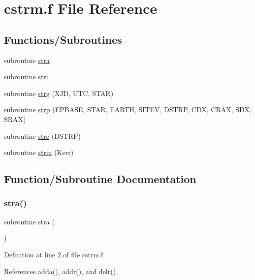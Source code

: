 \hypertarget{cstrm_8f}{}\section{cstrm.\+f File Reference}
\label{cstrm_8f}
\subsection*{Functions/\+Subroutines}
\begin{DoxyCompactItemize}
\item 
subroutine \hyperlink{cstrm_8f_aa1037acded2c0ef566a062bfc4609d4a}{stra}
\item 
subroutine \hyperlink{cstrm_8f_a6cebfa9d7b09bbf12e73113d94dae7ed}{stri}
\item 
subroutine \hyperlink{cstrm_8f_ac7544830764ddfede7a3de635483a4e5}{strg} (X\+JD, U\+TC, S\+T\+AR)
\item 
subroutine \hyperlink{cstrm_8f_abd2539dadf01efc58dae10cbed8b911e}{strp} (E\+P\+B\+A\+SE, S\+T\+AR, E\+A\+R\+TH, S\+I\+T\+EV, D\+S\+T\+RP, C\+DX, C\+R\+AX, S\+DX, S\+R\+AX)
\item 
subroutine \hyperlink{cstrm_8f_ac3e33c44ae38370d63973579100c33a2}{strc} (D\+S\+T\+RP)
\item 
subroutine \hyperlink{cstrm_8f_ac40e28cce05ed1dd7c0f0dc668c7e041}{strin} (Kerr)
\end{DoxyCompactItemize}


\subsection{Function/\+Subroutine Documentation}
\mbox{\label{cstrm_8f_aa1037acded2c0ef566a062bfc4609d4a}} 
\subsubsection{\texorpdfstring{stra()}{stra()}}
{\footnotesize\ttfamily subroutine stra (\begin{DoxyParamCaption}{ }\end{DoxyParamCaption})}



Definition at line 2 of file cstrm.\+f.



References adda(), addr(), and delr().

\mbox{\label{cstrm_8f_ac3e33c44ae38370d63973579100c33a2}} 
